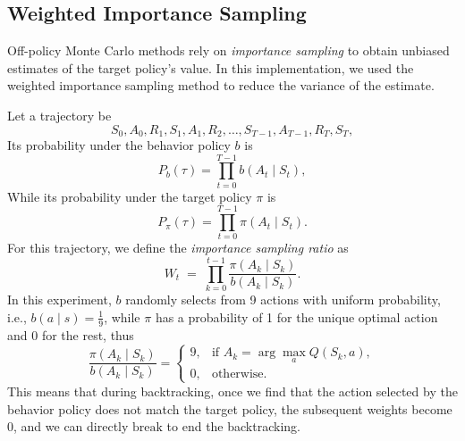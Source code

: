 \documentclass{article}
\begin{document}
\subsection{Weighted Importance Sampling}
Off-policy Monte Carlo methods rely on \emph{importance sampling} to obtain unbiased estimates of the target policy's value. In this implementation, we used the weighted importance sampling method to reduce the variance of the estimate.

Let a trajectory be
\[
S_0, A_0, R_1, S_1, A_1, R_2, \ldots, S_{T-1}, A_{T-1}, R_T, S_T,
\]
Its probability under the behavior policy \(b\) is
\[
P_b(\tau) = \prod_{t=0}^{T-1} b(A_t \mid S_t),
\]
While its probability under the target policy \(\pi\) is
\[
P_\pi(\tau) = \prod_{t=0}^{T-1} \pi(A_t \mid S_t).
\]
For this trajectory, we define the \emph{importance sampling ratio} as
\[
W_t \;=\; \prod_{k=0}^{t-1} \frac{\pi(A_k \mid S_k)}{b(A_k \mid S_k)}.
\]
In this experiment, \(b\) randomly selects from 9 actions with uniform probability, i.e., \(b(a \mid s) = \frac{1}{9}\), while \(\pi\) has a probability of 1 for the unique optimal action and 0 for the rest, thus
\[
\frac{\pi(A_k \mid S_k)}{b(A_k \mid S_k)} = 
\begin{cases}
9, & \text{if } A_k = \arg\max_{a} Q(S_k,a),\\
0, & \text{otherwise}.
\end{cases}
\]
This means that during backtracking, once we find that the action selected by the behavior policy does not match the target policy, the subsequent weights become 0, and we can directly \(\text{break}\) to end the backtracking. 
\end{document}
